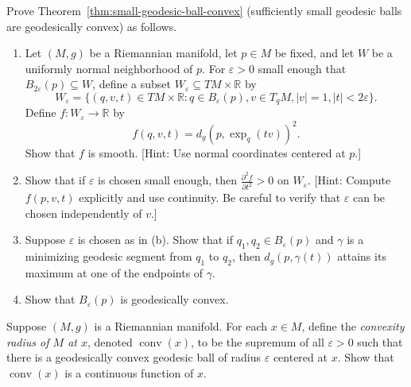 \begin{exercise}
\label{prob:geodesic-ball-convexity}

Prove Theorem~\ref{thm:small-geodesic-ball-convex} (sufficiently small geodesic balls are geodesically convex) as follows.
\begin{enumerate}
\item[(a)] Let $(M,g)$ be a Riemannian manifold, let $p \in M$ be fixed, and let $W$ be a uniformly normal neighborhood of $p$. For $\varepsilon > 0$ small enough that $B_{2\varepsilon}(p) \subseteq W$, define a subset $W_\varepsilon \subseteq TM \times \mathbb{R}$ by
\[
W_\varepsilon = \{(q, v, t) \in TM \times \mathbb{R} : q \in B_\varepsilon(p), v \in T_q M, |v| = 1, |t| < 2\varepsilon\}.
\]
Define $f: W_\varepsilon \to \mathbb{R}$ by
\[
f(q, v, t) = d_g(p, \exp_q(tv))^2.
\]
Show that $f$ is smooth. [Hint: Use normal coordinates centered at $p$.]
\item[(b)] Show that if $\varepsilon$ is chosen small enough, then $\frac{\partial^2 f}{\partial t^2} > 0$ on $W_\varepsilon$. [Hint: Compute $f(p, v, t)$ explicitly and use continuity. Be careful to verify that $\varepsilon$ can be chosen independently of $v$.]
\item[(c)] Suppose $\varepsilon$ is chosen as in (b). Show that if $q_1, q_2 \in B_\varepsilon(p)$ and $\gamma$ is a minimizing geodesic segment from $q_1$ to $q_2$, then $d_g(p, \gamma(t))$ attains its maximum at one of the endpoints of $\gamma$.
\item[(d)] Show that $B_\varepsilon(p)$ is geodesically convex.
\end{enumerate}
\end{exercise}

\begin{exercise}
\label{prob:convexity-radius-continuous}

Suppose $(M, g)$ is a Riemannian manifold. For each $x \in M$, define the \emph{convexity radius of $M$ at $x$}, denoted $\operatorname{conv}(x)$, to be the supremum of all $\varepsilon > 0$ such that there is a geodesically convex geodesic ball of radius $\varepsilon$ centered at $x$. Show that $\operatorname{conv}(x)$ is a continuous function of $x$.
\end{exercise}

